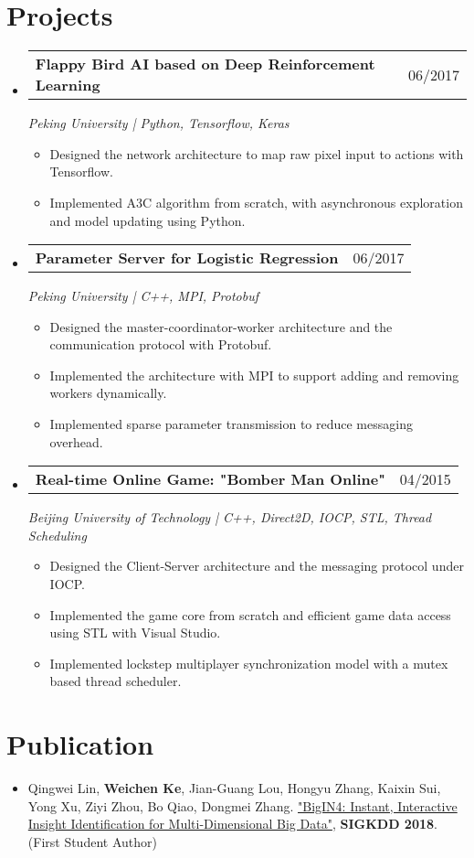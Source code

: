 \documentclass[a4paper,11pt]{article}
\makeatletter
\newcommand{\resumeItem}[1]{
  \item\small{#1 \vspace{-2pt}}
}
\newcommand{\resumeSubheading}[3]{
  \vspace{-1pt}\item
    \begin{tabular*}{0.97\textwidth}{l@{\extracolsep{\fill}}r}
      \textbf{#1} & #2
      \end{tabular*}
      \textit{\small#3}
}
\newcommand{\resumeItemListStart}{\begin{itemize}[leftmargin=*, topsep=0ex]}
\newcommand{\resumeItemListEnd}{\end{itemize}}
\makeatother
\begin{document}
\section{Projects}
  \begin{itemize}[leftmargin=*, itemsep=5pt, label={}]
    \resumeSubheading{Flappy Bird AI based on Deep Reinforcement Learning}{06/2017}
    {Peking University | Python, Tensorflow, Keras}
        \resumeItemListStart
            \resumeItem {Designed the network architecture to map raw pixel input to actions with Tensorflow.}
            \resumeItem {Implemented A3C algorithm from scratch, with asynchronous exploration and model updating using Python.}
        \resumeItemListEnd
    
    \resumeSubheading{Parameter Server for Logistic Regression}{06/2017}
    {Peking University | C++, MPI, Protobuf}
        \resumeItemListStart
            \resumeItem {Designed the master-coordinator-worker architecture and the communication protocol with Protobuf.}
            \resumeItem {Implemented the architecture with MPI to support adding and removing workers dynamically.}
            \resumeItem {Implemented sparse parameter transmission to reduce messaging overhead.}
        \resumeItemListEnd
        
    \resumeSubheading{Real-time Online Game: "Bomber Man Online"}{04/2015}{Beijing University of Technology | C++, Direct2D, IOCP, STL, Thread Scheduling}
        \resumeItemListStart
            \resumeItem {Designed the Client-Server architecture and the messaging protocol under IOCP.}
            \resumeItem {Implemented the game core from scratch and efficient game data access using STL with Visual Studio.}
            \resumeItem {Implemented lockstep multiplayer synchronization model with a mutex based thread scheduler.}
        \resumeItemListEnd
        
  \end{itemize}

\section{Publication}
  \begin{itemize}[leftmargin=*, itemsep=0pt, label={}]
    \resumeItem 
    {Qingwei Lin, \textbf{Weichen Ke}, Jian-Guang Lou, Hongyu Zhang, Kaixin Sui, Yong Xu, Ziyi Zhou, Bo Qiao, Dongmei Zhang. \href{http://www.kdd.org/kdd2018/accepted-papers/view/bigin4-instant-interactive-insight-identification-for-multi-dimensional-big}{"BigIN4: Instant, Interactive Insight Identification for Multi-Dimensional Big Data"}, \textbf{SIGKDD 2018}.  (First Student Author) }
  \end{itemize}
\end{document}
